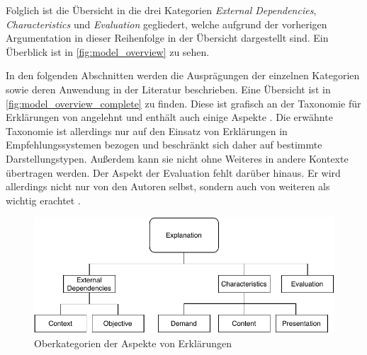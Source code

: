 \smallbreak

Folglich ist die Übersicht in die drei Kategorien \textit{External Dependencies}, \textit{Characteristics} und \textit{Evaluation} gegliedert, welche aufgrund der vorherigen Argumentation in dieser Reihenfolge in der Übersicht dargestellt sind. Ein Überblick ist in \autoref{fig:model_overview} zu sehen.

In den folgenden Abschnitten werden die Ausprägungen der einzelnen Kategorien sowie deren Anwendung in der Literatur beschrieben. Eine Übersicht ist in \autoref{fig:model_overview_complete} zu finden. Diese ist grafisch an der Taxonomie für Erklärungen von \citeauthor{nunes_systematic_2017} angelehnt und enthält auch einige Aspekte \cite{nunes_systematic_2017}. Die erwähnte Taxonomie ist allerdings nur auf den Einsatz von Erklärungen in Empfehlungssystemen bezogen und beschränkt sich daher auf bestimmte Darstellungstypen. Außerdem kann sie nicht ohne Weiteres in andere Kontexte übertragen werden. Der Aspekt der Evaluation fehlt darüber hinaus. Er wird allerdings nicht nur von den Autoren selbst, sondern auch von weiteren als wichtig erachtet \cite{cirqueira_scenario-based_2020, martin_evaluating_2021}.

\begin{figure}[htb!]
    \begin{center}
        \includegraphics[width=0.9\linewidth]{contents/05_model_description/res/model-overview.pdf}
    \end{center}
    \caption{Oberkategorien der Aspekte von Erklärungen}
    \label{fig:model_overview}
\end{figure}
